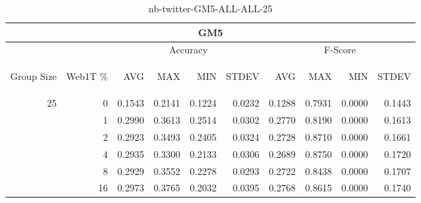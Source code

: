 \begin{center}
\begin{table}[htbp]
\begin{center}
\begin{tabular}{ | r | r | r | r | r | r | r | r | r | r |}
\hline
\multicolumn{10}{|c|}{GM5}\\
\hline
 & & \multicolumn{4}{|c|}{Accuracy} & \multicolumn{4}{|c|}{F-Score}\\ \cline{3-10}
\begin{sideways}Group Size\end{sideways} & \begin{sideways}Web1T \%\end{sideways} & \begin{sideways}AVG\end{sideways} & \begin{sideways}MAX\end{sideways} & \begin{sideways}MIN\end{sideways} & \begin{sideways}STDEV\end{sideways} & \begin{sideways}AVG\end{sideways} & \begin{sideways}MAX\end{sideways} & \begin{sideways}MIN\end{sideways} & \begin{sideways}STDEV\end{sideways}\\
\hline
\multirow{5}{*}{25}
 & 0 & 0.1543 & 0.2141 & 0.1224 & 0.0232 & 0.1288 & 0.7931 & 0.0000 & 0.1443\\ \cline{2-10}
 & 1 & 0.2990 & 0.3613 & 0.2514 & 0.0302 & 0.2770 & 0.8190 & 0.0000 & 0.1613\\ \cline{2-10}
 & 2 & 0.2923 & 0.3493 & 0.2405 & 0.0324 & 0.2728 & 0.8710 & 0.0000 & 0.1661\\ \cline{2-10}
 & 4 & 0.2935 & 0.3300 & 0.2133 & 0.0306 & 0.2689 & 0.8750 & 0.0000 & 0.1720\\ \cline{2-10}
 & 8 & 0.2929 & 0.3552 & 0.2278 & 0.0293 & 0.2722 & 0.8438 & 0.0000 & 0.1707\\ \cline{2-10}
 & 16 & 0.2973 & 0.3765 & 0.2032 & 0.0395 & 0.2768 & 0.8615 & 0.0000 & 0.1740\\ \cline{2-10}
\hline
\end{tabular}
\caption{nb-twitter-GM5-ALL-ALL-25}
\label{table:nb-twitter-GM5-ALL-ALL-25}
\end{center}
\end{table}
\end{center}

